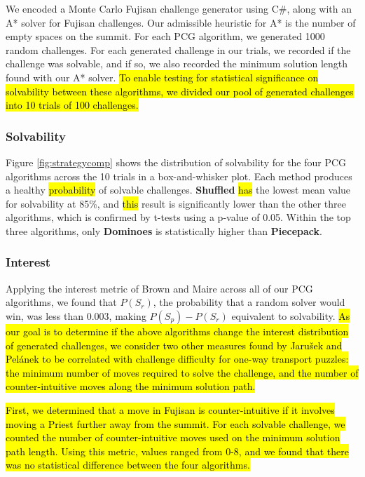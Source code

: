 \documentclass[journal]{IEEEtran}
\begin{document}
We encoded a Monte Carlo Fujisan challenge generator using C\#, along with an A* solver for Fujisan challenges. Our admissible heuristic for A* is the number of empty spaces on the summit. For each PCG algorithm, we generated 1000 random challenges.
For each generated challenge in our trials, we recorded if the challenge was solvable, and if so, we also recorded the minimum solution length found with our A* solver. \hl{To enable testing for statistical significance on solvability between these algorithms, we divided our pool of generated challenges into 10 trials of 100 challenges. }
 
\subsubsection{Solvability}

Figure \ref{fig:strategycomp} shows the distribution of solvability for the four PCG algorithms across the 10 trials in a box-and-whisker plot. Each method produces a healthy \hl{probability} of solvable challenges. {\bf Shuffled} \hl{has} the lowest mean value for solvability at 85\%, and \hl{this} result is significantly lower than the other three algorithms, which is confirmed by t-tests using a p-value of 0.05. Within the top three algorithms, only {\bf Dominoes} is statistically higher than {\bf Piecepack}. 

\subsubsection{Interest}

Applying the interest metric of Brown and Maire \cite{MCPUZZLE} across all of our PCG algorithms, we found that $P(S_r)$, the probability that a random solver would win, was less than 0.003, making $P(S_p) - P(S_r)$ equivalent to solvability. \hl{As our goal is to determine if the above algorithms change the interest distribution of generated challenges, we consider two other measures found by 
Jaru{\v{s}}ek and Pel{\'a}nek to be correlated with challenge difficulty for one-way transport puzzles:
the minimum number of moves required to solve the challenge, and the number of counter-intuitive moves along the minimum solution path.} \cite{jaruvsek2010difficulty}
\cite{jaruvsek2011determines}

\hl{First, we determined that a move in Fujisan is counter-intuitive if it involves moving a Priest further away from the summit. For each solvable challenge, we counted the number of counter-intuitive moves used on the minimum solution path length. Using this metric, values ranged from 0-8, and we found that there was no statistical difference between the four algorithms.}
\end{document}
